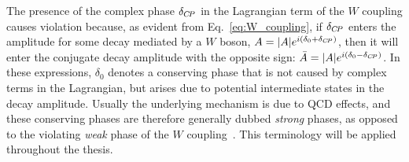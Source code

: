 The presence of the complex phase $\delta_{{C\!P}}$ in the Lagrangian term of the $W$ coupling causes \CP violation because, as evident from Eq.~\eqref{eq:W_coupling}, if $\delta_{{C\!P}}$ enters the amplitude for some decay mediated by a $W$ boson, $A=|A|e^{i(\delta_0 + \delta_{{C\!P}})}$, then it will enter the \CP conjugate decay amplitude with the opposite sign: $\bar A=|A|e^{i(\delta_0 - \delta_{{C\!P}})}$. In these expressions, $\delta_0$ denotes a \CP conserving phase that is not caused by complex terms in the Lagrangian, but arises due to potential intermediate states in the decay amplitude. Usually the underlying mechanism is due to QCD effects, and these \CP conserving phases are therefore generally dubbed \emph{strong} phases, as opposed to the \CP violating \emph{weak} phase of the $W$ coupling~\cite{PDG2020}. This terminology will be applied throughout the thesis. 

